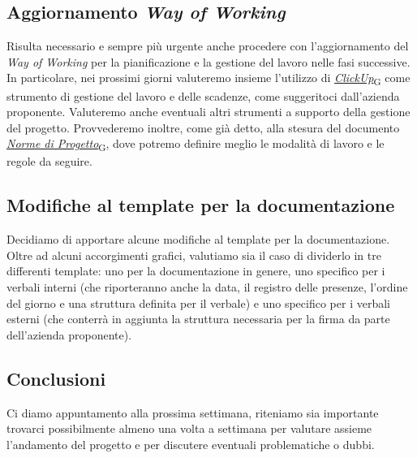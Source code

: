 \documentclass[italian,12pt]{article} %
\begin{document}
\subsection{Aggiornamento \textit{Way of Working}}
Risulta necessario e sempre più urgente anche procedere con l'aggiornamento del
\textit{Way of Working} per la pianificazione e la gestione del lavoro nelle fasi
successive. \\
In particolare, nei prossimi giorni valuteremo insieme l'utilizzo di \href{https://7last.github.io/docs/rtb/documentazione-interna/glossario#clickup}{\textit{ClickUp}\textsubscript{G}}
come strumento di gestione del lavoro e delle scadenze, come suggeritoci
dall'azienda proponente. Valuteremo anche eventuali altri strumenti a supporto della
gestione del progetto. Provvederemo inoltre, come già detto, alla stesura del
documento \href{https://7last.github.io/docs/rtb/documentazione-interna/glossario#norme-di-progetto}{\textit{Norme di Progetto}\textsubscript{G}}, dove potremo definire meglio le modalità di
lavoro e le regole da seguire.

\subsection{Modifiche al template per la documentazione}
Decidiamo di apportare alcune modifiche al template per la documentazione. \\
Oltre ad alcuni accorgimenti grafici, valutiamo sia il caso di dividerlo
in tre differenti template: uno per la documentazione in genere, uno specifico per i verbali interni (che riporteranno anche la data, il registro delle presenze, l'ordine del giorno e una struttura definita per il verbale) e uno specifico per i verbali esterni (che conterrà in aggiunta la struttura necessaria per la firma da parte dell'azienda proponente).

\subsection{Conclusioni}
Ci diamo appuntamento alla prossima settimana, riteniamo sia
importante trovarci possibilmente almeno una volta a settimana per valutare assieme
l'andamento del progetto e per discutere eventuali problematiche o dubbi.
\end{document}
